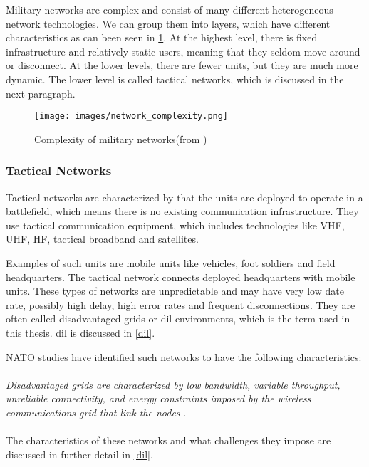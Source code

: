 Military networks are complex and consist of many different heterogeneous
network technologies. We can group them into layers, which have different
characteristics as can been seen in \cref{figure:military-networks}. At the
highest level, there is fixed infrastructure and relatively static users,
meaning that they seldom move around or disconnect. At the lower levels, there
are fewer units, but they are much more dynamic. The lower level is called
tactical networks, which is discussed in the next paragraph.

\begin{figure}[h]
\texttt{[image: images/network\_complexity.png]}
\caption{Complexity of military networks(from \cite{pervasive-web})}
\label{figure:military-networks}
\end{figure}

\subsubsection{Tactical Networks}
Tactical networks are characterized by that the units are deployed to operate in
a battlefield, which means there is no existing communication infrastructure.
They use tactical communication equipment, which includes technologies like VHF,
UHF, HF, tactical broadband and satellites\cite{ist-090}.

Examples of such units are mobile units like vehicles, foot soldiers and field
headquarters. The tactical network connects deployed headquarters with mobile
units. These types of networks are unpredictable and may have very low date
rate, possibly high delay, high error rates and frequent disconnections. They
are often called disadvantaged grids or \gls{dil} environments, which is the
term used in this thesis. \gls{dil} is discussed in \cref{dil}.

NATO studies\cite{nato-disadvantaged-grids} have identified such networks to
have the following characteristics:
\\\\
\textit{
Disadvantaged grids are characterized by low bandwidth, variable throughput,
unreliable connectivity, and energy constraints imposed by the wireless
communications grid that link the nodes
}.
\paragraph{}
The characteristics of these networks and what challenges they impose are
discussed in further detail in \cref{dil}.


